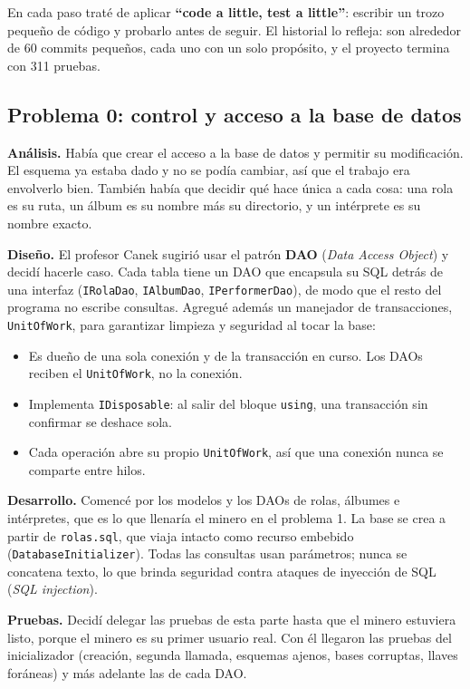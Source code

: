 \documentclass{article}
\begin{document}
En cada paso traté de aplicar \textbf{``code a little, test a little''}:
escribir un trozo pequeño de código y probarlo antes de seguir. El historial
lo refleja: son alrededor de 60 commits pequeños, cada uno con un solo
propósito, y el proyecto termina con 311 pruebas.

\subsection{Problema 0: control y acceso a la base de datos}

\textbf{Análisis.} Había que crear el acceso a la base de datos y permitir
su modificación. El esquema ya estaba dado y no se podía cambiar, así que el
trabajo era envolverlo bien. También había que decidir qué hace única a cada
cosa: una rola es su ruta, un álbum es su nombre más su directorio, y un
intérprete es su nombre exacto.

\textbf{Diseño.} El profesor Canek sugirió usar el patrón \textbf{DAO}
(\emph{Data Access Object}) y decidí hacerle caso. Cada tabla tiene un DAO
que encapsula su SQL detrás de una interfaz (\texttt{IRolaDao},
\texttt{IAlbumDao}, \texttt{IPerformerDao}), de modo que el resto del
programa no escribe consultas. Agregué además un manejador de transacciones,
\texttt{UnitOfWork}, para garantizar limpieza y seguridad al tocar la base:

\begin{itemize}
	\item Es dueño de una sola conexión y de la transacción en curso. Los
	DAOs reciben el \texttt{UnitOfWork}, no la conexión.
	\item Implementa \texttt{IDisposable}: al salir del bloque
	\texttt{using}, una transacción sin confirmar se deshace sola.
	\item Cada operación abre su propio \texttt{UnitOfWork}, así que una
	conexión nunca se comparte entre hilos.
\end{itemize}

\textbf{Desarrollo.} Comencé por los modelos y los DAOs de rolas, álbumes e
intérpretes, que es lo que llenaría el minero en el problema 1. La base se
crea a partir de \texttt{rolas.sql}, que viaja intacto como recurso embebido
(\texttt{DatabaseInitializer}). Todas las consultas usan parámetros; nunca se
concatena texto, lo que brinda seguridad contra ataques de inyección de SQL
(\emph{SQL injection}).

\textbf{Pruebas.} Decidí delegar las pruebas de esta parte hasta que el
minero estuviera listo, porque el minero es su primer usuario real. Con él
llegaron las pruebas del inicializador (creación, segunda llamada, esquemas
ajenos, bases corruptas, llaves foráneas) y más adelante las de cada DAO.
\end{document}
